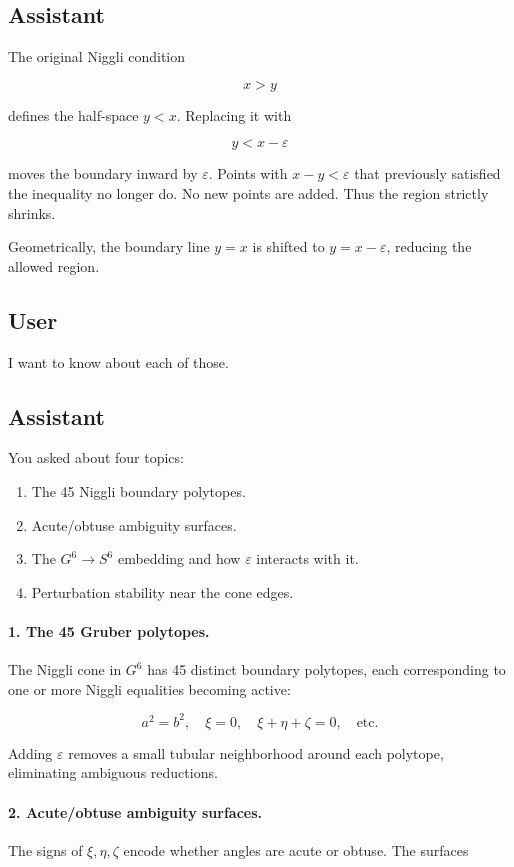 \documentclass[12pt]{article}
\begin{document}
	\subsection*{Assistant}
	The original Niggli condition
	
	
	\[
	x > y
	\]
	
	
	defines the half-space $y < x$.  
	Replacing it with
	
	
	\[
	y < x - \varepsilon
	\]
	
	
	moves the boundary inward by $\varepsilon$.  
	Points with $x - y < \varepsilon$ that previously satisfied the inequality no longer do.  
	No new points are added.  
	Thus the region strictly shrinks.
	
	Geometrically, the boundary line $y = x$ is shifted to $y = x - \varepsilon$, reducing the allowed region.
	
	\subsection*{User}
	I want to know about each of those.
	
	\subsection*{Assistant}
	You asked about four topics:
	
	\begin{enumerate}
		\item The 45 Niggli boundary polytopes.
		\item Acute/obtuse ambiguity surfaces.
		\item The $G^6 \to S^6$ embedding and how $\varepsilon$ interacts with it.
		\item Perturbation stability near the cone edges.
	\end{enumerate}
	
	\paragraph{1. The 45 Gruber polytopes.}
	The Niggli cone in $G^6$ has 45 distinct boundary polytopes, each corresponding to one or more Niggli equalities becoming active:
	
	
	\[
	a^2 = b^2,\quad \xi = 0,\quad \xi + \eta + \zeta = 0,\quad \text{etc.}
	\]
	
	
	Adding $\varepsilon$ removes a small tubular neighborhood around each polytope, eliminating ambiguous reductions.
	
	\paragraph{2. Acute/obtuse ambiguity surfaces.}
	The signs of $\xi, \eta, \zeta$ encode whether angles are acute or obtuse.  
	The surfaces
	
\end{document}
